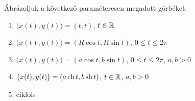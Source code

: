 \documentclass[11pt]{article}
\begin{document}
\begin{exbox}
\begin{example}
Ábrázoljuk a következő paraméteresen megadott görbéket.
\begin{enumerate}[label=\arabic*., itemsep=2pt]
\item $\bigl(x(t), y(t)\bigr)=(t, t)$, $t\in\mathbb{R}$
\item $\bigl(x(t), y(t)\bigr)=(R\cos t, R\sin t)$, $0\le t\le 2\pi$
\item $\bigl(x(t), y(t)\bigr)=(a\cos t, b\sin t)$, $0\le t\le 2\pi$, $a, b>0$
\item $\bigl(x(t), y(t)\bigr)=(a\operatorname{ch} t, b\operatorname{sh} t)$, $t\in\mathbb{R}$, $a, b>0$
\item ciklois
\end{enumerate}
\end{example}
\end{exbox}
\end{document}
